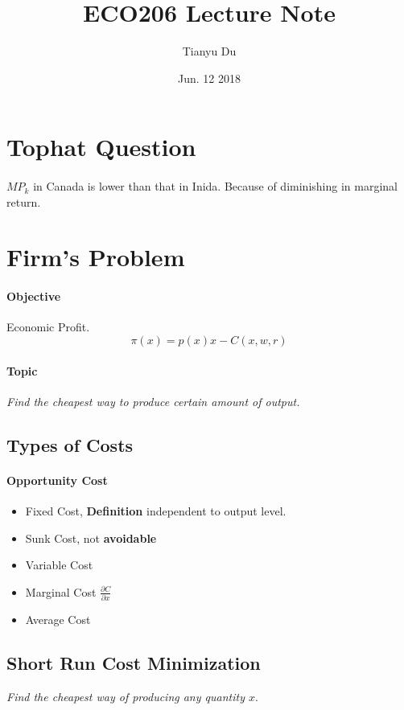 \documentclass{article}
\title{ECO206 Lecture Note}
\date{Jun. 12 2018}
\author{Tianyu Du}
\newcommand{\pd}[2]{\frac{\partial{#1}}{\partial{#2}}}
\begin{document}
\maketitle

\section{Tophat Question}

	\paragraph{} $MP_{k}$ in Canada is lower than that in Inida. Because of diminishing in marginal return.


\section{Firm's Problem}

	\paragraph{Objective} Economic Profit.
	\[
		\pi (x) = p(x)x - C(x, w, r)
	\]

	\paragraph{Topic} \emph{Find the cheapest way to produce certain amount of output.}

	\subsection{Types of Costs}
		\paragraph{Opportunity Cost}
		\begin{itemize}
			\item Fixed Cost, \textbf{Definition} independent to output level.
			\item Sunk Cost, not \textbf{avoidable}
			\item Variable Cost
			\item Marginal Cost $\pd{C}{x}$
			\item Average Cost
		\end{itemize}


	\subsection{Short Run Cost Minimization}
		\emph{Find the cheapest way of producing any quantity $x$}.
\end{document}
